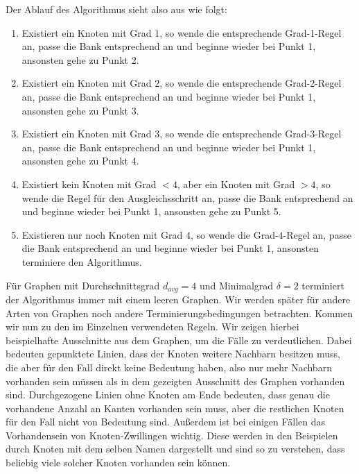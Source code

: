 \documentclass[12pt,onecolumn, notitlepage]{scrartcl}
\begin{document}
Der Ablauf des Algorithmus sieht also aus wie folgt:
\begin{enumerate}
\item Existiert ein Knoten mit Grad $1$, so wende die entsprechende Grad-1-Regel an, passe die Bank entsprechend an und beginne wieder bei Punkt 1, ansonsten gehe zu Punkt 2.
\item Existiert ein Knoten mit Grad $2$, so wende die entsprechende Grad-2-Regel an, passe die Bank entsprechend an und beginne wieder bei Punkt 1, ansonsten gehe zu Punkt 3.
\item Existiert ein Knoten mit Grad $3$, so wende die entsprechende Grad-3-Regel an, passe die Bank entsprechend an und beginne wieder bei Punkt 1, ansonsten gehe zu Punkt 4.
\item Existiert kein Knoten mit Grad $<4$, aber ein Knoten mit Grad $>4$, so wende die Regel für den Ausgleichsschritt an, passe die Bank entsprechend an und beginne wieder bei Punkt 1, ansonsten gehe zu Punkt 5.
\item Existieren nur noch Knoten mit Grad $4$, so wende die Grad-$4$-Regel an, passe die Bank entsprechend an und beginne wieder bei Punkt 1, ansonsten terminiere den Algorithmus. 
\end{enumerate}  
Für Graphen mit Durchschnittsgrad $d_{avg} = 4$ und Minimalgrad $\delta = 2$ terminiert der Algorithmus immer mit einem leeren Graphen. Wir werden später für andere Arten von Graphen noch andere Terminierungsbedingungen betrachten. \newline
Kommen wir nun zu den im Einzelnen verwendeten Regeln. Wir zeigen hierbei beispielhafte Ausschnitte aus dem Graphen, um die Fälle zu verdeutlichen. Dabei bedeuten gepunktete Linien, dass der Knoten weitere Nachbarn besitzen muss, die aber für den Fall direkt keine Bedeutung haben, also nur mehr Nachbarn vorhanden sein müssen als in dem gezeigten Ausschnitt des Graphen vorhanden sind. Durchgezogene Linien ohne Knoten am Ende bedeuten, dass genau die vorhandene Anzahl an Kanten vorhanden sein muss, aber die restlichen Knoten für den Fall nicht von Bedeutung sind. Außerdem ist bei einigen Fällen das Vorhandensein von Knoten-Zwillingen wichtig. Diese werden in den Beispielen durch Knoten mit dem selben Namen dargestellt und sind so zu verstehen, dass beliebig viele solcher Knoten vorhanden sein können. \newline\newline
\end{document}
